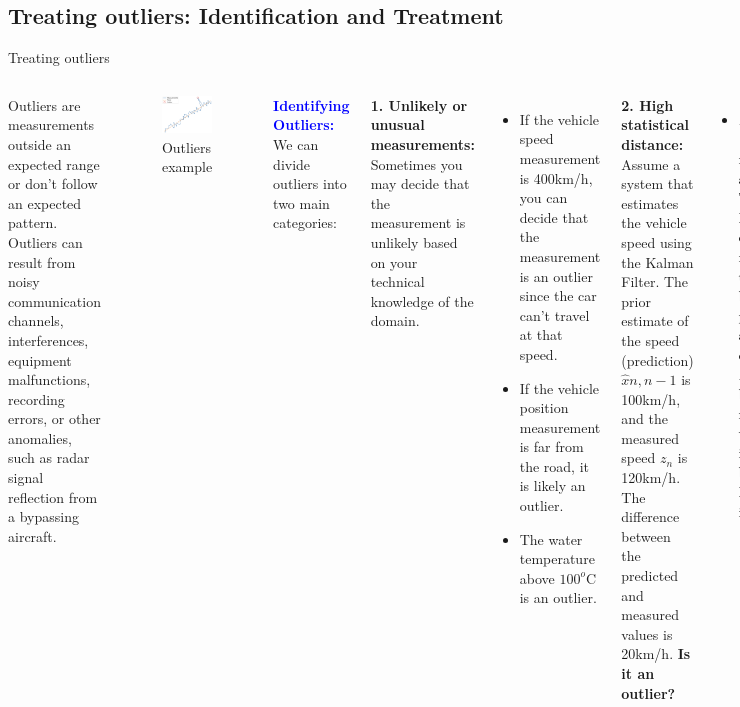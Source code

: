 \subsection{Treating outliers: Identification and Treatment}
\begin{frame}{Treating outliers}
\begin{columns}
    Outliers are measurements outside an expected range or don’t follow an expected pattern. Outliers can result from noisy communication channels, interferences, equipment malfunctions, recording errors, or other anomalies, such as radar signal reflection from a bypassing aircraft.
    \begin{figure}
        \centering
        \includegraphics[width=0.6\linewidth]{Figures//Part4/Outliers.png}
        \vspace{-10pt}
        \caption{Outliers example}
    \end{figure}
    \textcolor{blue}{\textbf{Identifying Outliers:}} We can divide outliers into two main categories:
    
    \textbf{1. Unlikely or unusual measurements:} Sometimes you may decide that the measurement is unlikely based on your technical knowledge of the domain.
    
    \begin{itemize}
        \item If the vehicle speed measurement is 400km/h, you can decide that the measurement is an outlier since the car can’t travel at that speed.
        \item If the vehicle position measurement is far from the road, it is likely an outlier.
        \item The water temperature above $100^o$C is an outlier.
    \end{itemize}
    \textbf{2. High statistical distance:} Assume a system that estimates the vehicle speed using the Kalman Filter. The prior estimate of the speed (prediction) $\hat{x}{n,n-1}$ is 100km/h, and the measured speed $z_n$ is 120km/h. The difference between the predicted and measured values is 20km/h. \textbf{Is it an outlier?}
    \begin{itemize}
        \item \textit{Mahalanobis distance} is needed to answer this: The Mahalanobis distance is a measure of the distance between a point $P$ and a distribution $D$ or between two random variables, introduced by P. C. Mahalanobis in 1936.
    \end{itemize}
    

\end{columns}
\end{frame}
